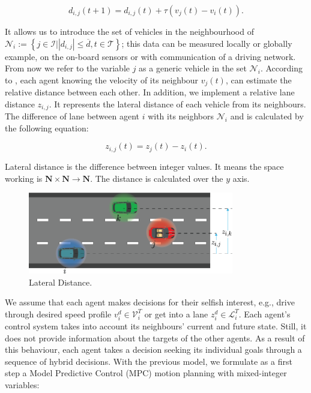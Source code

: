 \begin{equation}
d_{i,j}(t+1)= d_{i,j}(t) + \tau(v_j(t)-v_i(t)).
\label{eq:distance}
\end{equation}



It allows us to introduce the set of vehicles in the neighbourhood of  $\mathcal{N}_i:= \left\{ j \in \mathcal{I}  | \left| d_{i,j} \right| \le \overline{d}, t \in \mathcal{T}\right\}$; this data can be measured locally or globally example, on the on-board sensors or with communication of a driving network. From now we refer to the variable $j$ as a generic vehicle in the set $\mathcal{N}_i$. According to \label{eq:distance}, each agent knowing the velocity of its neighbour $v_j(t)$, can estimate the relative distance between each other.
In addition, we implement a relative lane distance $z_{i,j}$. It represents the lateral distance of each vehicle from its neighbours. The difference of lane between agent $i$ with its neighbors $\mathcal{N}_i$ and is calculated by the following equation:



\begin{equation}
z_{i,j}(t)= z_{j}(t) - z_{i}(t).
\label{eq:lanes}
\end{equation}



Lateral distance is the difference between integer values. It means the space working is $\mathbf{N} \times \mathbf{N} \to \mathbf{N}$. The distance is calculated over the $y$ axis.


\begin{figure}[H]
    \centering
    \includegraphics[width=0.8\textwidth]{Kap3/Asset 5.png}
    \caption{Lateral Distance.}
    \label{fig:lanes}
\end{figure}

We assume that each agent makes decisions for their selfish interest, e.g., drive through desired speed profile $v_i^d \in \mathcal{V}^T_i$ or get into a lane $z_i^d \in \mathcal{L}^T_i $. Each agent's control system takes into account its neighbours' current and future state. Still, it does not provide information about the targets of the other agents. As a result of this behaviour, each agent takes a decision seeking its individual goals through a sequence of hybrid decisions.
With the previous model, we formulate as a first step a Model Predictive Control (MPC) motion planning with mixed-integer variables:

